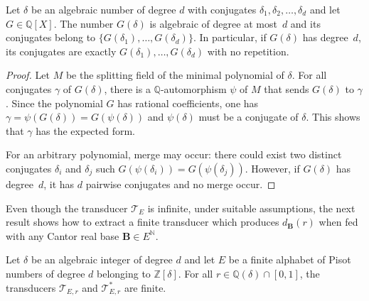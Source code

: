 \documentclass[12pt,reqno]{amsart}
\newcommand{\B}{{\mathbf{B}}}
\begin{document}
\begin{lemma}\label{lem:minpolydelta}
    Let $\delta$ be an algebraic number of degree $d$ with conjugates $\delta_1,\delta_2,\ldots,\delta_d$ and
    let $G\in \mathbb{Q}[X]$. The number $G(\delta)$ is algebraic of degree at most~$d$ and its conjugates belong to $\{G(\delta_1),\ldots,G(\delta_d)\}$. In particular, if $G(\delta)$ has degree~$d$, its conjugates are exactly $G(\delta_1),\ldots,G(\delta_d)$ with no repetition.
\end{lemma}

\begin{proof}
Let $M$ be the splitting field of the minimal polynomial of $\delta$.
For all conjugates $\gamma$ of $G(\delta)$, there is a $\mathbb{Q}$-automorphism $\psi$ of $M$ that sends $G(\delta)$ to $\gamma$. Since the polynomial $G$ has rational coefficients, one has $\gamma=\psi(G(\delta))=G(\psi(\delta))$ and $\psi(\delta)$ must be a conjugate of $\delta$. This shows that $\gamma$ has the expected form. 

For an arbitrary polynomial, merge may occur: there could exist two distinct conjugates $\delta_i$ and $\delta_j$ such $G(\psi(\delta_i))=G(\psi(\delta_j))$. However, if $G(\delta)$ has degree~$d$, it has $d$ pairwise conjugates and no merge occur.
\end{proof}

Even though the transducer $\mathcal{T}_E$ is infinite, under suitable assumptions, the next result shows how to extract a finite transducer which produces $d_\B(r)$ when fed with any Cantor real base $\B\in E^\mathbb{N}$.

\begin{theorem}\label{thm:main_transducer}
  Let $\delta$ be an algebraic integer of degree $d$
  and let $E$ be a finite alphabet of Pisot numbers of degree $d$ belonging to $\mathbb{Z}[\delta]$. For all $r\in\mathbb{Q}(\delta)\cap [0,1]$, the transducers $\mathcal{T}_{E,r}$ and $\mathcal{T}^*_{E,r}$ are finite.
\end{theorem}
\end{document}
